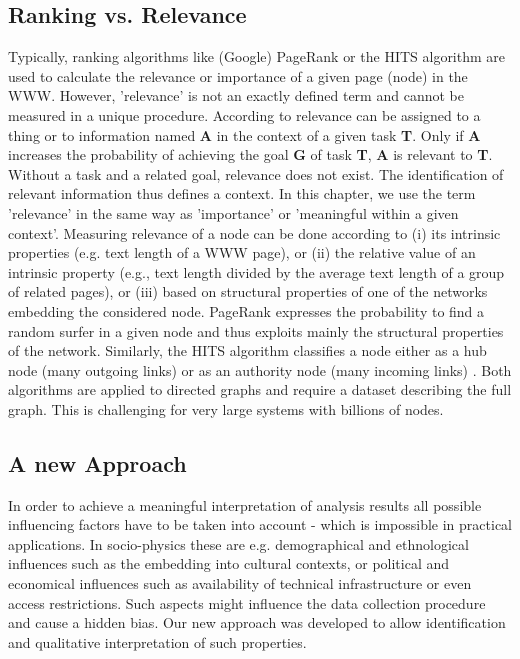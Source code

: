 \documentclass[a4paper,10pt]{scrbook}
\begin{document}
\subsection*{Ranking vs. Relevance}

Typically, ranking algorithms like (Google) PageRank
\cite{ilprints422,ilprints361} or the HITS algorithm
\cite{Kleinberg:1999:ASH:324133.324140} are used to calculate the relevance or
importance of a given page (node) in the WWW. However, 'relevance' is not an
exactly defined term and cannot be measured in a unique procedure. According to
\cite{hjorland_work_2002} relevance can be assigned to a thing or to information
named \textbf{A} in the context of a given task \textbf{T}. Only if \textbf{A}
increases the probability of achieving the goal \textbf{G} of task \textbf{T},
\textbf{A} is relevant to \textbf{T}. Without a task and a related goal,
relevance does not exist. The identification of relevant information thus
defines a context. In this chapter, we use the term 'relevance' in the same way as 
'importance' or 'meaningful within a given context'. Measuring relevance of a
node can be done according to (i) its intrinsic properties (e.g. text length of
a WWW page), or (ii) the relative value of an intrinsic property (e.g., text
length divided by the average text length of a group of related pages), or (iii)
based on structural properties of one of the networks embedding the considered
node. PageRank expresses the probability to find a random surfer in a given node
\cite{ilprints422,chebolu2008pagerank} and thus exploits mainly the structural
properties of the network. Similarly, the HITS algorithm classifies a node
either as a hub node (many outgoing links) or as an authority node (many
incoming links) \cite{Kleinberg:1999:ASH:324133.324140}. Both algorithms are
applied to directed graphs and require a dataset describing the full graph. This
is challenging for very large systems with billions of nodes. 

\subsection*{A new Approach}

In order to achieve a meaningful interpretation of analysis results all possible influencing 
factors have to be taken into account - which is impossible in practical applications. In socio-physics these are e.g. demographical and ethnological influences such as the embedding 
into cultural contexts, or political and economical influences such as availability of technical infrastructure or even 
access restrictions. Such aspects might influence the data collection procedure and cause a hidden bias. Our new approach
was developed to allow identification and qualitative interpretation of such properties.
\end{document}
